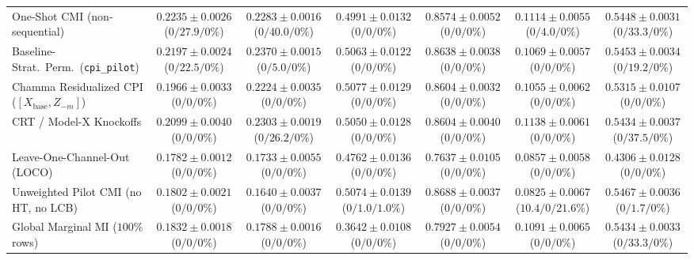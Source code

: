 \documentclass[11pt]{article}
\theoremstyle{remark}
\begin{document}
\begin{table}[t]
{\begin{tabular}{lcccccc}
\midrule
One-Shot CMI (non-sequential) & $0.2235\pm 0.0026$ ($0/\mathbf{27.9}/0\%$) & $0.2283\pm 0.0016$ ($0/\mathbf{40.0}/0\%$) & $0.4991\pm 0.0132$ ($0/0/0\%$) & $0.8574\pm 0.0052$ ($0/0/0\%$) & $0.1114\pm 0.0055$ ($0/\mathbf{4.0}/0\%$) & $0.5448\pm 0.0031$ ($0/\mathbf{33.3}/0\%$) \\
Baseline-Strat.\ Perm.\ (\texttt{cpi\_pilot}) & $0.2197\pm 0.0024$ ($0/\mathbf{22.5}/0\%$) & $0.2370\pm 0.0015$ ($0/\mathbf{5.0}/0\%$) & $0.5063\pm 0.0122$ ($0/0/0\%$) & $0.8638\pm 0.0038$ ($0/0/0\%$) & $0.1069\pm 0.0057$ ($0/0/0\%$) & $0.5453\pm 0.0034$ ($0/\mathbf{19.2}/0\%$) \\
Chamma Residualized CPI ($[X_{\text{base}}, Z_{-m}]$) & $0.1966\pm 0.0033$ ($0/0/0\%$) & $0.2224\pm 0.0035$ ($0/0/0\%$) & $0.5077\pm 0.0129$ ($0/0/0\%$) & $0.8604\pm 0.0032$ ($0/0/0\%$) & $0.1055\pm 0.0062$ ($0/0/0\%$) & $0.5315\pm 0.0107$ ($0/0/0\%$) \\
CRT / Model-X Knockoffs & $0.2099\pm 0.0040$ ($0/0/0\%$) & $0.2303\pm 0.0019$ ($0/\mathbf{26.2}/0\%$) & $0.5050\pm 0.0128$ ($0/0/0\%$) & $0.8604\pm 0.0040$ ($0/0/0\%$) & $0.1138\pm 0.0061$ ($0/0/0\%$) & $0.5434\pm 0.0037$ ($0/\mathbf{37.5}/0\%$) \\
Leave-One-Channel-Out (LOCO) & $0.1782\pm 0.0012$ ($0/0/0\%$) & $0.1733\pm 0.0055$ ($0/0/0\%$) & $0.4762\pm 0.0136$ ($0/0/0\%$) & $0.7637\pm 0.0105$ ($0/0/0\%$) & $0.0857\pm 0.0058$ ($0/0/0\%$) & $0.4306\pm 0.0128$ ($0/0/0\%$) \\
Unweighted Pilot CMI (no HT, no LCB) & $0.1802\pm 0.0021$ ($0/0/0\%$) & $0.1640\pm 0.0037$ ($0/0/0\%$) & $0.5074\pm 0.0139$ ($0/\mathbf{1.0}/\mathbf{1.0\%}$) & $0.8688\pm 0.0037$ ($0/0/0\%$) & $0.0825\pm 0.0067$ ($\mathbf{10.4}/0/\mathbf{21.6\%}$) & $0.5467\pm 0.0036$ ($0/\mathbf{1.7}/0\%$) \\
Global Marginal MI ($100\%$ rows) & $0.1832\pm 0.0018$ ($0/0/0\%$) & $0.1788\pm 0.0016$ ($0/0/0\%$) & $0.3642\pm 0.0108$ ($0/0/0\%$) & $0.7927\pm 0.0054$ ($0/0/0\%$) & $0.1091\pm 0.0065$ ($0/0/0\%$) & $0.5434\pm 0.0033$ ($0/\mathbf{33.3}/0\%$) \\
\bottomrule
\end{tabular}%
}
\end{table}
\end{document}
